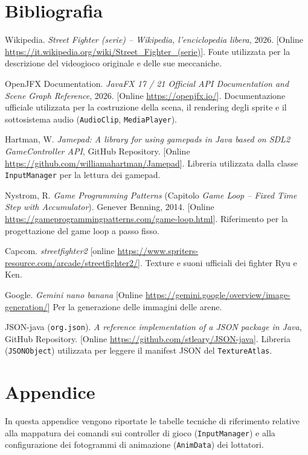 \documentclass[11pt, a4paper]{article}
\begin{document}
	\section{Bibliografia}
	\begin{enumerate}[label={[\arabic*]}]
		\item Wikipedia. \emph{Street Fighter (serie) -- Wikipedia, l'enciclopedia libera}, 2026. [Online \url{https://it.wikipedia.org/wiki/Street_Fighter_(serie)}]. Fonte utilizzata per la descrizione del videogioco originale e delle sue meccaniche.
		\item OpenJFX Documentation. \emph{JavaFX 17 / 21 Official API Documentation and Scene Graph Reference}, 2026. [Online \url{https://openjfx.io/}]. Documentazione ufficiale utilizzata per la costruzione della scena, il rendering degli sprite e il sottosistema audio (\texttt{AudioClip}, \texttt{MediaPlayer}).
		\item Hartman, W. \emph{Jamepad: A library for using gamepads in Java based on SDL2 GameController API}, GitHub Repository. [Online \url{https://github.com/williamahartman/Jamepad}]. Libreria utilizzata dalla classe \texttt{InputManager} per la lettura dei gamepad.
		\item Nystrom, R. \emph{Game Programming Patterns} (Capitolo \emph{Game Loop -- Fixed Time Step with Accumulator}). Genever Benning, 2014. [Online \url{https://gameprogrammingpatterns.com/game-loop.html}]. Riferimento per la progettazione del game loop a passo fisso.
		\item Capcom. \emph{streetfighter2} [online \url{https://www.spriters-resource.com/arcade/streetfighter2/}]. Texture e suoni ufficiali dei fighter Ryu e Ken.
		\item Google. \emph{Gemini nano banana} [Online \url{https://gemini.google/overview/image-generation/}] Per la generazione delle immagini delle arene.
		\item JSON-java (\texttt{org.json}). \emph{A reference implementation of a JSON package in Java}, GitHub Repository. [Online \url{https://github.com/stleary/JSON-java}]. Libreria (\texttt{JSONObject}) utilizzata per leggere il manifest JSON del \texttt{TextureAtlas}.
	\end{enumerate}
	
	\newpage
	
	\section{Appendice}
	In questa appendice vengono riportate le tabelle tecniche di riferimento relative alla mappatura dei comandi sui controller di gioco (\texttt{InputManager}) e alla configurazione dei fotogrammi di animazione (\texttt{AnimData}) dei lottatori.
	
\end{document}
